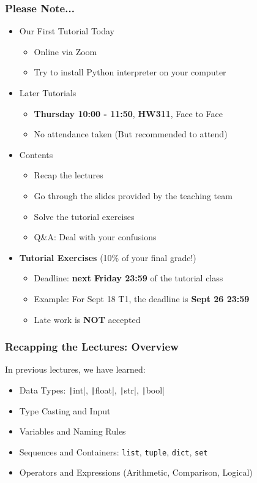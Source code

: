 \documentclass{beamer}
\begin{document}
\begin{frame}
    \frametitle{Please Note...}

    \begin{itemize}
        \item Our First Tutorial Today
              \begin{itemize}
                  \item Online via Zoom
                  \item Try to install Python interpreter on your computer
              \end{itemize}
        \item Later Tutorials
              \begin{itemize}
                  \item \textbf{Thursday 10:00 - 11:50}, \textbf{HW311}, Face to Face
                  \item No attendance taken (But recommended to attend)
              \end{itemize}
        \item Contents
              \begin{itemize}
                  \item Recap the lectures
                  \item Go through the slides provided by the teaching team
                  \item Solve the tutorial exercises
                  \item Q\&A: Deal with your confusions
              \end{itemize}
        \item \textbf{Tutorial Exercises} (10\% of your final grade!)
              \begin{itemize}
                  \item Deadline: \textbf{next Friday 23:59} of the tutorial class
                  \item Example: For Sept 18 T1, the deadline is \textbf{Sept 26 23:59}
                  \item Late work is \textbf{NOT} accepted
              \end{itemize}
    \end{itemize}
\end{frame}

\begin{frame}
    \frametitle{Recapping the Lectures: Overview}
    In previous lectures, we have learned:
    \begin{itemize}
        \item Data Types: \texttt|int|, \texttt|float|, \texttt|str|, \texttt|bool|
        \item Type Casting and Input
        \item Variables and Naming Rules
        \item Sequences and Containers: \texttt{list}, \texttt{tuple}, \texttt{dict}, \texttt{set}
        \item Operators and Expressions (Arithmetic, Comparison, Logical)
    \end{itemize}
\end{frame}
\end{document}
